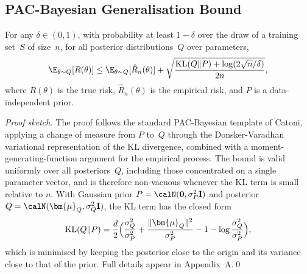 \subsection{PAC-Bayesian Generalisation Bound}

\begin{theorem}
\label{thm:pac_bayes}
For any $\delta\in(0,1)$, with probability at least $1-\delta$ over the draw of a training set~$S$ of size~$n$, for all posterior distributions~$Q$ over parameters,
\begin{equation}
\E_{\theta\sim Q}[R(\theta)]
\le \E_{\theta\sim Q}[\hat{R}_n(\theta)]
+ \sqrt{\frac{\mathrm{KL}(Q\|P)+\log(2\sqrt{n}/\delta)}{2n}},
\label{eq:pac_bayes}
\end{equation}
where $R(\theta)$ is the true risk, $\hat{R}_n(\theta)$ is the empirical risk, and $P$ is a data-independent prior.
\end{theorem}

\noindent\textit{Proof sketch.} The proof follows the standard PAC-Bayesian template of Catoni, applying a change of measure from $P$ to~$Q$ through the Donsker-Varadhan variational representation of the KL divergence, combined with a moment-generating-function argument for the empirical process. The bound is valid uniformly over all posteriors~$Q$, including those concentrated on a single parameter vector, and is therefore non-vacuous whenever the KL term is small relative to $n$. With Gaussian prior $P=\calN(\mathbf{0},\sigma_P^2\mathbf{I})$ and posterior $Q=\calN(\bm{\mu}_Q,\sigma_Q^2\mathbf{I})$, the KL term has the closed form
\begin{equation}
\mathrm{KL}(Q\|P)
= \frac{d}{2}\Bigl(
  \frac{\sigma_Q^2}{\sigma_P^2}
  + \frac{\|\bm{\mu}_Q\|^2}{\sigma_P^2}
  - 1
  - \log\frac{\sigma_Q^2}{\sigma_P^2}
\Bigr),
\label{eq:pac_kl_gauss}
\end{equation}
which is minimised by keeping the posterior close to the origin and its variance close to that of the prior. Full details appear in Appendix~A.\qed

